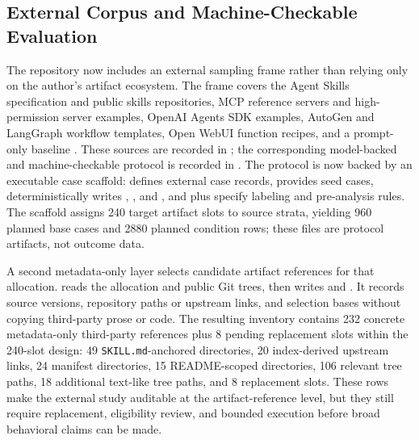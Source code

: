 \documentclass[11pt]{article}
\begin{document}
\subsection{External Corpus and Machine-Checkable Evaluation}

The repository now includes an external sampling frame rather than relying
only on the author's artifact ecosystem. The frame covers the Agent Skills
specification and public skills repositories, MCP reference servers and
high-permission server examples, OpenAI Agents SDK examples, AutoGen and
LangGraph workflow templates, Open WebUI function recipes, and a prompt-only
baseline \citep{agentskills2026spec,anthropic2026skills,modelcontextprotocol2026servers,openai2026agentspython,openai2026agentsjs,wu2024autogen}.
These sources are recorded in
; the corresponding
model-backed and machine-checkable protocol is recorded in
.
The protocol is now backed by an executable case scaffold:
 defines external case
records,  provides seed cases,
 deterministically writes
,
, and
, and
 plus
 specify labeling and pre-analysis
rules. The scaffold assigns 240 target artifact slots to source strata,
yielding 960 planned base cases and 2880 planned condition rows; these files
are protocol artifacts, not outcome data.

A second metadata-only layer selects candidate artifact references for that
allocation.  reads the allocation
and public Git trees, then writes
 and
. It records source
versions, repository paths or upstream links, and selection bases without
copying third-party prose or code. The resulting inventory contains 232
concrete metadata-only third-party references plus 8 pending replacement slots
within the 240-slot design: 49 \texttt{SKILL.md}-anchored directories, 20
index-derived upstream links, 24 manifest directories, 15 README-scoped
directories, 106 relevant tree paths, 18 additional text-like tree paths, and
8 replacement slots. These rows make the external study auditable at the
artifact-reference level, but they still require replacement, eligibility
review, and bounded execution before broad behavioral claims can be made.
\end{document}
